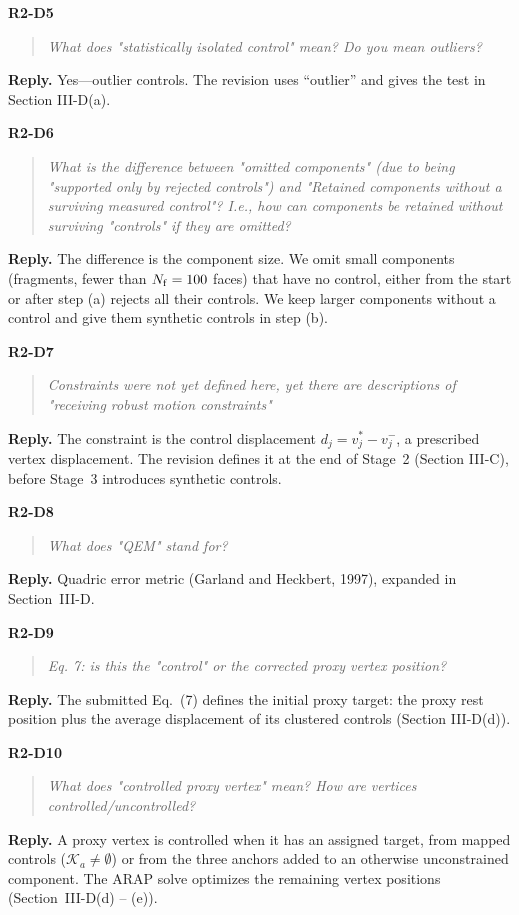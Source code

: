 \documentclass[11pt,a4paper]{article}
\newcommand{\point}[2]{\par\medskip\textbf{#1}\par\begin{quote}\itshape #2\end{quote}}
\newenvironment{reply}{\begingroup\color{replyblue}\textbf{Reply.} }{\par\endgroup}
\begin{document}
\point{R2-D5}{What does "statistically isolated control" mean? Do you mean outliers?}
\begin{reply}
Yes---outlier controls. The revision uses ``outlier'' and gives the test in Section III-D(a).
\end{reply}

\point{R2-D6}{What is the difference between "omitted components" (due to being "supported only by rejected controls") and "Retained components without a surviving measured control"? I.e., how can components be retained without surviving "controls" if they are omitted?}
\begin{reply}
The difference is the component size. We omit small components (fragments, fewer than $N_{\rm f}=100$ faces) that have no control, either from the start or after step (a) rejects all their controls. We keep larger components without a control and give them synthetic controls in step (b).
\end{reply}

\point{R2-D7}{Constraints were not yet defined here, yet there are descriptions of "receiving robust motion constraints"}
\begin{reply}
The constraint is the control displacement $d_j=v_j^*-v_j^-$, a prescribed vertex displacement. The revision defines it at the end of Stage~2 (Section III-C), before Stage~3 introduces synthetic controls.
\end{reply}

\point{R2-D8}{What does "QEM" stand for?}
\begin{reply}
Quadric error metric (Garland and Heckbert, 1997), expanded in Section~III-D.
\end{reply}

\point{R2-D9}{Eq. 7: is this the "control" or the corrected proxy vertex position?}
\begin{reply}
The submitted Eq.~(7) defines the initial proxy target: the proxy rest position plus the average displacement of its clustered controls (Section III-D(d)).
\end{reply}

\point{R2-D10}{What does "controlled proxy vertex" mean? How are vertices controlled/uncontrolled?}
\begin{reply}
A proxy vertex is controlled when it has an assigned target, from mapped controls ($\mathcal K_a\neq\emptyset$) or from the three anchors added to an otherwise unconstrained component. The ARAP solve optimizes the remaining vertex positions (Section~III-D(d) -- (e)).
\end{reply}
\end{document}
